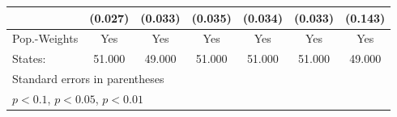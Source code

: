 {\begin{tabular}{l*{6}{c}}
            &     (0.027)         &     (0.033)         &     (0.035)         &     (0.034)         &     (0.033)         &     (0.143)         \\
\hline
Pop.-Weights&         Yes         &         Yes         &         Yes         &         Yes         &         Yes         &         Yes         \\
States:     &      51.000         &      49.000         &      51.000         &      51.000         &      51.000         &      49.000         \\
\hline\hline
\multicolumn{7}{l}{\footnotesize Standard errors in parentheses}\\
\multicolumn{7}{l}{\footnotesize \sym{*} \(p<0.1\), \sym{**} \(p<0.05\), \sym{***} \(p<0.01\)}\\
\end{tabular}
}
